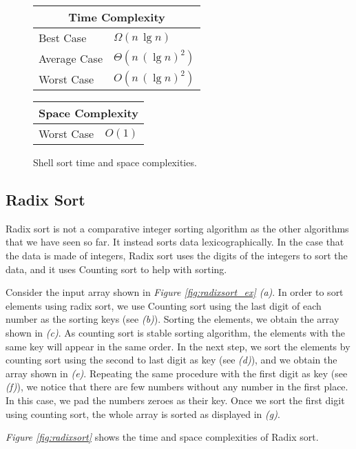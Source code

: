 \begin{figure}[!ht]
    \centering
    \begin{tabular}{l|l}
    \multicolumn{2}{c}{\textbf{Time Complexity}} \\
    \hline
    Best Case    & $\Omega(n \, \lg n)$ \\
    Average Case & $\Theta(n \, (\lg n)^2)$ \\
    Worst Case   & $O(n \, (\lg n)^2)$ \\
    \end{tabular}
    \quad\quad
    \begin{tabular}{l|l}
    \multicolumn{2}{c}{\textbf{Space Complexity}} \\
    \hline
    Worst Case   & $O(1)$
    \end{tabular}
    
    \caption{Shell sort time\cite{big-o} and space complexities\cite{big-o}.}
    \label{fig:shellsort}
\end{figure}


\subsection{Radix Sort}

Radix sort is not a comparative integer sorting algorithm as the other algorithms that we have seen so far. It instead sorts data lexicographically. In the case that the data is made of integers, Radix sort uses the digits of the integers to sort the data, and it uses Counting sort to help with sorting.

Consider the input array shown in \textit{Figure \ref{fig:radixsort_ex} (a)}. In order to sort elements using radix sort, we use Counting sort using the last digit of each number as the sorting keys (see \textit{(b)}). Sorting the elements, we obtain the array shown in \textit{(c)}. As counting sort is stable sorting algorithm, the elements with the same key will appear in the same order. In the next step, we sort the elements by counting sort using the second to last digit as key (see \textit{(d)}), and we obtain the array shown in \textit{(e)}. Repeating the same procedure with the first digit as key (see \textit{(f)}), we notice that there are few numbers without any number in the first place. In this case, we pad the numbers zeroes as their key. Once we sort the first digit using counting sort, the whole array is sorted as displayed in \textit{(g)}.

\textit{Figure \ref{fig:radixsort}} shows the time and space complexities of Radix sort.

